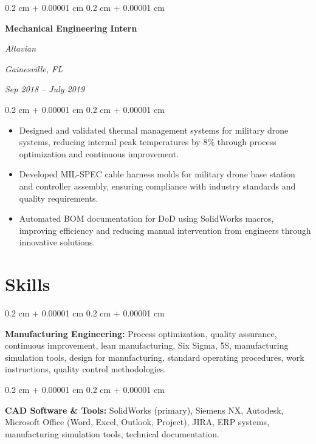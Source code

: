 \documentclass[10pt, letterpaper]{article}
\newenvironment{highlights}{
    \begin{itemize}[
        topsep=0.10 cm,
        parsep=0.10 cm,
        partopsep=0pt,
        itemsep=0pt,
        leftmargin=0.4 cm + 10pt
    ]
}{
    \end{itemize}
} %
\newenvironment{onecolentry}{
    \begin{adjustwidth}{
        0.2 cm + 0.00001 cm
    }{
        0.2 cm + 0.00001 cm
    }
}{
    \end{adjustwidth}
} %
\newenvironment{twocolentry}[2][]{
    \onecolentry
    \def\secondColumn{#2}
    \setcolumnwidth{\fill, 9.0 cm}
    \begin{paracol}{2}
}{
    \switchcolumn \raggedleft \secondColumn
    \end{paracol}
    \endonecolentry
} %
\begin{document}
        \vspace{0.35 cm}

        \begin{twocolentry}{
        \textit{Gainesville, FL}    
            
        \textit{Sep 2018 – July 2019}}
            \textbf{Mechanical Engineering Intern}
            
            \textit{Altavian}
        \end{twocolentry}

        \vspace{0.10 cm}
        \begin{onecolentry}
            \begin{highlights}
                \item Designed and validated thermal management systems for military drone systems, reducing internal peak temperatures by 8\% through process optimization and continuous improvement.
                \item Developed MIL-SPEC cable harness molds for military drone base station and controller assembly, ensuring compliance with industry standards and quality requirements.
                \item Automated BOM documentation for DoD using SolidWorks macros, improving efficiency and reducing manual intervention from engineers through innovative solutions.
            \end{highlights}
        \end{onecolentry}


\vspace{0.4 cm}


    
    \section{Skills}

        \begin{onecolentry}
            \textbf{Manufacturing Engineering:} Process optimization, quality assurance, continuous improvement, lean manufacturing, Six Sigma, 5S, manufacturing simulation tools, design for manufacturing, standard operating procedures, work instructions, quality control methodologies.
        \end{onecolentry}

        \vspace{0.2 cm}

        \begin{onecolentry}
            \textbf{CAD Software \& Tools:} SolidWorks (primary), Siemens NX, Autodesk, Microsoft Office (Word, Excel, Outlook, Project), JIRA, ERP systems, manufacturing simulation tools, technical documentation.
        \end{onecolentry}
\end{document}
